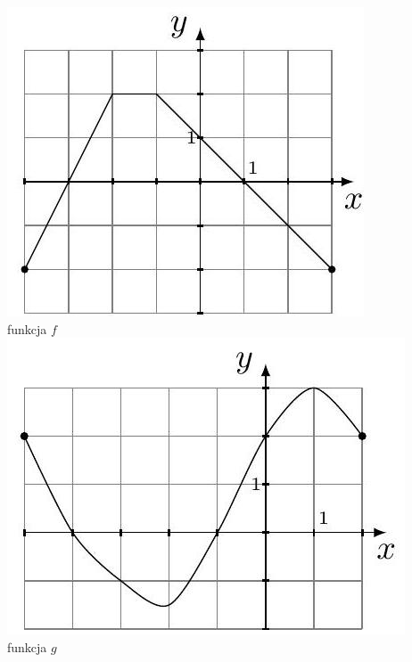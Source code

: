 \documentclass[10pt]{article}
\begin{document}
\begin{enumerate}
\includegraphics[max width=\textwidth, center]{2024_11_21_e9b4faa005d5be2cc318g-127}\\
funkcja \(f\)\\
\includegraphics[max width=\textwidth, center]{2024_11_21_e9b4faa005d5be2cc318g-127(1)}\\
funkcja \(g\)\\

\end{enumerate}
\end{document}
